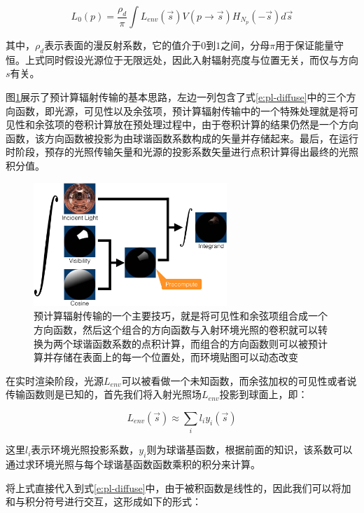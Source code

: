 \begin{equation}\label{e:pl-diffuse}
	L_0(p)=\frac{\rho_d}{\pi}\int L_{env}(\vec{s})V(p\to\vec{s})H_{N_p}(-\vec{s})d\vec{s}
\end{equation} 

\noindent 其中，$\rho_d$表示表面的漫反射系数，它的值介于$0$到$1$之间，分母$\pi$用于保证能量守恒。上式同时假设光源位于无限远处，因此入射辐射亮度与位置无关，而仅与方向$s$有关。

图\ref{f:pl-diffuse}展示了预计算辐射传输的基本思路，左边一列包含了式\ref{e:pl-diffuse}中的三个方向函数，即光源，可见性以及余弦项，预计算辐射传输中的一个特殊处理就是将可见性和余弦项的卷积计算放在预处理过程中，由于卷积计算的结果仍然是一个方向函数，该方向函数被投影为由球谐函数系数构成的矢量并存储起来。最后，在运行时阶段，预存的光照传输矢量和光源的投影系数矢量进行点积计算得出最终的光照积分值。

\begin{figure}
	\sidecaption
	\includegraphics[width=0.65\textwidth]{figures/prt/prt-7}
	\caption{预计算辐射传输的一个主要技巧，就是将可见性和余弦项组合成一个方向函数，然后这个组合的方向函数与入射环境光照的卷积就可以转换为两个球谐函数系数的点积计算，而组合的方向函数则可以被预计算并存储在表面上的每一个位置处，而环境贴图可以动态改变}
	\label{f:pl-diffuse}
\end{figure}

在实时渲染阶段，光源$L_{env}$可以被看做一个未知函数，而余弦加权的可见性或者说传输函数则是已知的，首先我们将入射光照场$L_{env}$投影到球面上，即：

\begin{equation}
	L_{env}(\vec{s})\approx\sum_{i}l_iy_i(\vec{s})
\end{equation}

\noindent 这里$l_i$表示环境光照投影系数，$y_i$则为球谐基函数，根据前面的知识，该系数可以通过求环境光照与每个球谐基函数函数乘积的积分来计算。

将上式直接代入到式\ref{e:pl-diffuse}中，由于被积函数是线性的，因此我们可以将加和与积分符号进行交互，这形成如下的形式：

